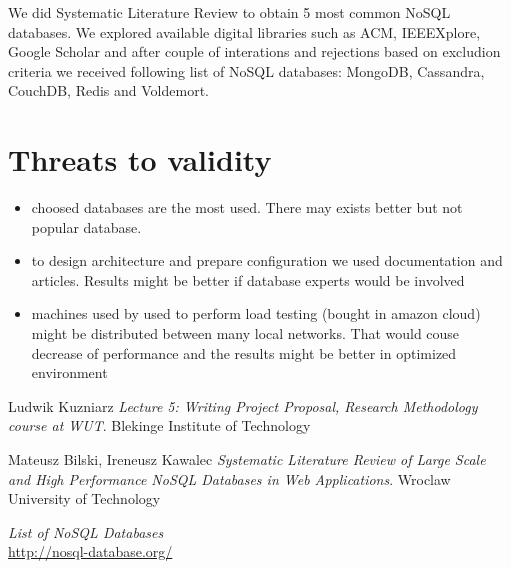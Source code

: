 \documentclass[times, 10pt,twocolumn]{article}
\newcounter{firstbib}
\begin{document}
	We did Systematic Literature Review \cite{slr} to obtain 5 most common
	NoSQL databases. We explored available digital libraries such as ACM, IEEEXplore,
	Google Scholar and after couple of interations and rejections based on
	excludion criteria we received following list of NoSQL databases: MongoDB, Cassandra, CouchDB, Redis and Voldemort.  

\section{Threats to validity}

\begin{itemize}
	\item choosed databases are the most used. There may exists better but not popular database.
	\item to design architecture and prepare configuration we used documentation and articles. Results might be better if database experts would be involved
	\item machines used by used to perform load testing (bought in amazon cloud) might be distributed between many local networks. That would 
	couse decrease of performance and the results might be better in optimized environment
\end{itemize}

\begin{thebibliography}{9}  

\setcounter{enumiv}{\value{firstbib}}
      
      Ludwik Kuzniarz
      \emph{Lecture 5: Writing Project Proposal, Research Methodology course at WUT}. Blekinge Institute of Technology
      
      Mateusz Bilski, Ireneusz Kawalec
      \emph{Systematic Literature Review of Large Scale and High Performance NoSQL Databases in Web Applications}. Wroclaw University of Technology
      
      \emph{List of NoSQL Databases} \\
      \url{http://nosql-database.org/}

\end{thebibliography}
\end{document}

